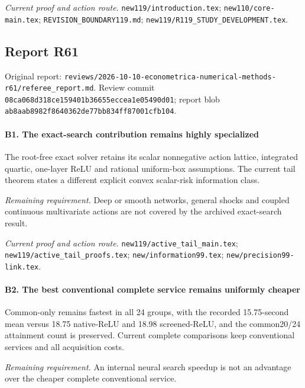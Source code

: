 \par\emph{Current proof and action route.} \nolinkurl{new119/introduction.tex}; \nolinkurl{new110/core-main.tex}; \nolinkurl{REVISION_BOUNDARY119.md}; \nolinkurl{new119/R119_STUDY_DEVELOPMENT.tex}.

\subsection{Report R61}

Original report: \nolinkurl{reviews/2026-10-10-econometrica-numerical-methods-r61/referee_report.md}. Review commit \nolinkurl{08ca068d318ce159401b36655eccea1e05490d01}; report blob \nolinkurl{ab8aab8982f8640362de77bb834ff87001cfb104}.

\paragraph{B1. The exact-search contribution remains highly specialized}

The root-free exact solver retains its scalar nonnegative action lattice, integrated quartic, one-layer ReLU and rational uniform-box assumptions. The current tail theorem states a different explicit convex scalar-risk information class.

\par\emph{Remaining requirement.} Deep or smooth networks, general shocks and coupled continuous multivariate actions are not covered by the archived exact-search result.

\par\emph{Current proof and action route.} \nolinkurl{new119/active_tail_main.tex}; \nolinkurl{new119/active_tail_proofs.tex}; \nolinkurl{new/information99.tex}; \nolinkurl{new/precision99-link.tex}.

\paragraph{B2. The best conventional complete service remains uniformly cheaper}

Common-only remains fastest in all 24 groups, with the recorded 15.75-second mean versus 18.75 native-ReLU and 18.98 screened-ReLU, and the common20/24 attainment count is preserved. Current complete comparisons keep conventional services and all acquisition costs.

\par\emph{Remaining requirement.} An internal neural search speedup is not an advantage over the cheaper complete conventional service.

